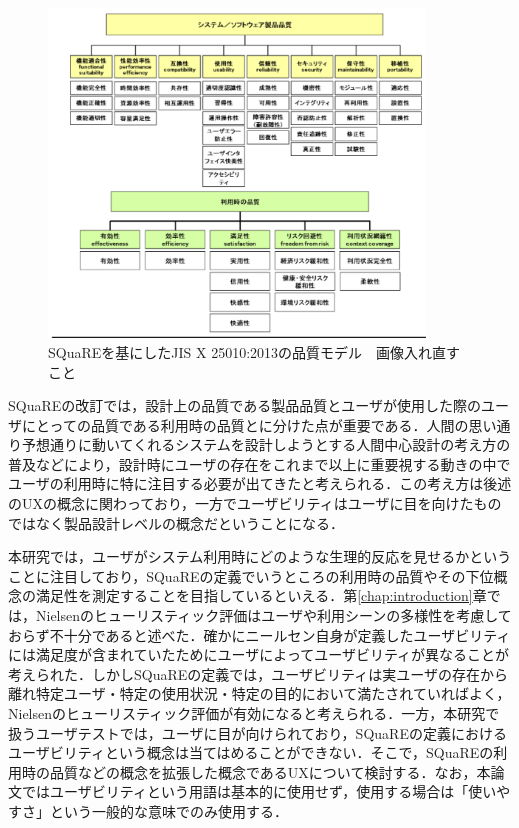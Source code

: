 \begin{figure}[htbp]
  \begin{minipage}{\hsize}
    \begin{center}
       \includegraphics[width=100mm]{img/square.png}
    \end{center}
    \caption{SQuaREを基にしたJIS X 25010:2013の品質モデル　画像入れ直すこと}
    \label{fig:square}
  \end{minipage}
\end{figure}

SQuaREの改訂では，設計上の品質である製品品質とユーザが使用した際のユーザにとっての品質である利用時の品質とに分けた点が重要である．人間の思い通り予想通りに動いてくれるシステムを設計しようとする人間中心設計\cite{kurosu2013}の考え方の普及などにより，設計時にユーザの存在をこれまで以上に重要視する動きの中でユーザの利用時に特に注目する必要が出てきたと考えられる．この考え方は後述のUXの概念に関わっており，一方でユーザビリティはユーザに目を向けたものではなく製品設計レベルの概念だということになる．

本研究では，ユーザがシステム利用時にどのような生理的反応を見せるかということに注目しており，SQuaREの定義でいうところの利用時の品質やその下位概念の満足性を測定することを目指しているといえる．第\ref{chap:introduction}章では，Nielsenのヒューリスティック評価はユーザや利用シーンの多様性を考慮しておらず不十分であると述べた．確かにニールセン自身が定義したユーザビリティには満足度が含まれていたためにユーザによってユーザビリティが異なることが考えられた．しかしSQuaREの定義では，ユーザビリティは実ユーザの存在から離れ特定ユーザ・特定の使用状況・特定の目的において満たされていればよく，Nielsenのヒューリスティック評価が有効になると考えられる．一方，本研究で扱うユーザテストでは，ユーザに目が向けられており，SQuaREの定義におけるユーザビリティという概念は当てはめることができない．そこで，SQuaREの利用時の品質などの概念を拡張した概念であるUXについて検討する．なお，本論文ではユーザビリティという用語は基本的に使用せず，使用する場合は「使いやすさ」という一般的な意味でのみ使用する．


